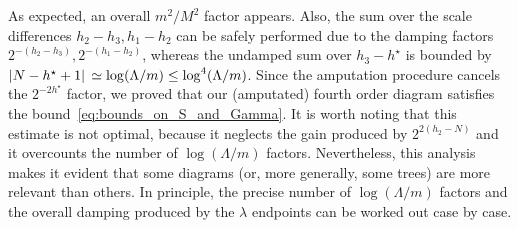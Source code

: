 \documentclass[a4paper, 11pt]{article}
\newcommand{\cutoff}{\Lambda}								%
\theoremstyle{thm}
\begin{document}
As expected, an overall $m^2/M^2$ factor appears. Also, the sum over the scale differences $h_2 - h_3, h_1 - h_2$ can be safely performed due to the damping factors $2^{-(h_2 - h_3)}, 2^{-(h_1 - h_2)}$, whereas the undamped sum over $h_3 - h^\star$ is bounded by $\abs*{N - h^\star + 1} \simeq \log(\cutoff/m) \le \log^4(\cutoff/m)$. Since the amputation procedure cancels the $2^{-2h^\star}$ factor, we proved that our (amputated) fourth order diagram satisfies the bound~\eqref{eq:bounds_on_S_and_Gamma}. It is worth noting that this estimate is not optimal, because it neglects the gain produced by $2^{2(h_2 - N)}$ and it overcounts the number of $\log(\cutoff/m)$ factors. Nevertheless, this analysis makes it evident that some diagrams (or, more generally, some trees) are more relevant than others. In principle, the precise number of $\log(\cutoff/m)$ factors and the overall damping produced by the $\lambda$ endpoints can be worked out case by case.
\end{document}
